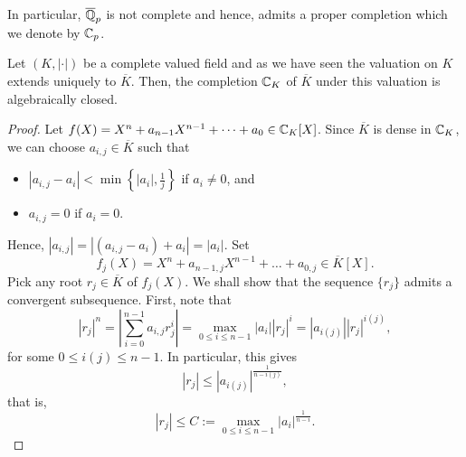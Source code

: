 \begin{remark}
    In particular, $\overline{\mathbb{Q}}_p$ is not complete and hence, admits a proper completion which we denote by $\mathbb{C}_p$.
\end{remark}

\begin{theorem}
    Let $(K, |\cdot|)$ be a complete valued field and as we have seen the valuation on $K$ extends uniquely to $\overline K$. Then, the completion $\mathbb{C}_K$ of $\overline K$ under this valuation is algebraically closed.
\end{theorem}
\begin{proof}
    Let $f(X) = X^n + a_{n - 1}X^{n - 1} + \dots + a_0\in\mathbb{C}_K[X]$. Since $\overline K$ is dense in $\mathbb{C}_K$, we can choose $a_{i, j}\in\overline K$ such that 
    \begin{itemize}
        \item $|a_{i, j} - a_i| < \min\left\{|a_i|, \frac{1}{j}\right\}$ if $a_i\ne 0$, and 
        \item $a_{i, j} = 0$ if $a_i = 0$.
    \end{itemize}
    Hence, $|a_{i, j}| = |(a_{i, j} - a_i) + a_i| = |a_i|$. Set 
    \begin{equation*}
        f_j(X) = X^n + a_{n - 1, j}X^{n - 1} + \dots + a_{0, j}\in\overline K[X].
    \end{equation*}
    Pick any root $r_j\in\overline K$ of $f_j(X)$. We shall show that the sequence $\{r_j\}$ admits a convergent subsequence. First, note that 
    \begin{equation*}
        |r_j|^n = \left|\sum_{i = 0}^{n - 1} a_{i, j}r_j^i\right| = \max_{0\le i\le n - 1} |a_i| |r_j|^i = |a_{i(j)}| |r_j|^{i(j)},
    \end{equation*}
    for some $0\le i(j)\le n - 1$. In particular, this gives 
    \begin{equation*}
        |r_j|\le |a_{i(j)}|^{\frac{1}{n - i(j)}},
    \end{equation*}
    that is, 
    \begin{equation*}
        |r_j|\le C := \max_{0\le i\le n - 1} |a_i|^{\frac{1}{n - i}}.
    \end{equation*}


\end{proof}
